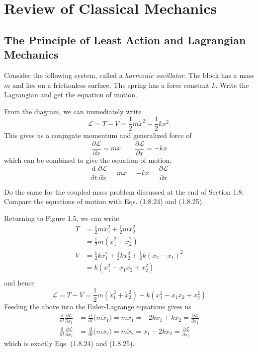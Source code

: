 \documentclass[../principles-of-quantum-mechanics.tex]{subfiles}
\begin{document}
	\printanswers
	
	\section{Review of Classical Mechanics}
	
	\begin{questions}
		\setcounter{subsection}{0}
		\setcounter{question}{0}
		\subsection{The Principle of Least Action and Lagrangian Mechanics}
		
		\question Consider the following system, called a \textit{harmonic oscillator}. The block has a mass $m$ and lies on a frictionless surface. The spring has a force constant $k$. Write the Lagrangian and get the equation of motion.
		
		\begin{solution}
			From the diagram, we can immediately write
			\[
				\mathcal{L} = T - V = \frac{1}{2}m\dot{x}^2 - \frac{1}{2}kx^2.
			\]
			This gives us a conjugate momentum and generalized force of
			\[
				\frac{\partial\mathcal{L}}{\partial{\dot{x}}} = m\dot{x} \qquad \frac{\partial\mathcal{L}}{\partial{x}} = -kx
			\]
			which can be combined to give the equation of motion,
			\[
				\frac{\mathrm{d}}{\mathrm{d}t}\frac{\partial\mathcal{L}}{\partial{\dot{x}}} = m\ddot{x} = -kx = \frac{\partial\mathcal{L}}{\partial{x}}
			\]
		\end{solution}
	
		\question Do the same for the coupled-mass problem discussed at the end of Section 1.8. Compare the equations of motion with Eqs. (1.8.24) and (1.8.25).
		
		\begin{solution}
			Returning to Figure 1.5, we can write
			\begin{align*}
				T &= \frac{1}{2}m\dot{x}_1^2 + \frac{1}{2}m\dot{x}_2^2 \\
				&= \frac{1}{2}m(\dot{x}_1^2 + \dot{x}_2^2) \\
				V &= \frac{1}{2}kx_1^2 + \frac{1}{2}kx_2^2 + \frac{1}{2}k(x_2-x_1)^2 \\
				&= k(x_1^2 - x_1x_2 + x_2^2) \\
			\end{align*}
			and hence
			\[
				\mathcal{L} = T - V = \frac{1}{2}m(\dot{x}_1^2 + \dot{x}_2^2) - k(x_1^2-x_1x_2+x_2^2)
			\]
			Feeding the above into the Euler-Lagrange equations gives us
			\begin{align*}
				\frac{\mathrm{d}}{\mathrm{d}t}\frac{\partial\mathcal{L}}{\partial\dot{x}_1} &= \frac{\mathrm{d}}{\mathrm{d}t}\Big(m\dot{x}_1\Big) = m\ddot{x}_1 = -2kx_1 + kx_2 = \frac{\partial\mathcal{L}}{\partial{x}_1} \\
				\frac{\mathrm{d}}{\mathrm{d}t}\frac{\partial\mathcal{L}}{\partial\dot{x}_2} &= \frac{\mathrm{d}}{\mathrm{d}t}\Big(m\dot{x}_2\Big) = m\ddot{x}_2 = x_1 - 2kx_2 = \frac{\partial\mathcal{L}}{\partial{x}_2}
			\end{align*}
			which is exactly Eqs. (1.8.24) and (1.8.25).
		\end{solution}
	

\end{questions}
\end{document}

